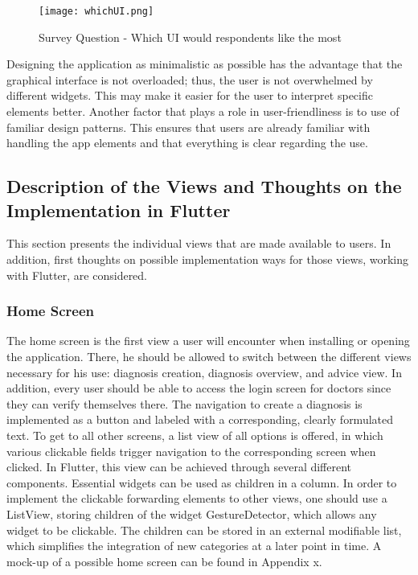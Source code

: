 \begin{figure}[H]
	\centering
	\texttt{[image: whichUI.png]}
	\caption[Survey Question]{Survey Question - Which UI would respondents like the most}
\end{figure}
\noindent
Designing the application as minimalistic as possible has the advantage that the graphical interface is not overloaded; thus, the user is not overwhelmed by different widgets. This may make it easier for the user to interpret specific elements better. Another factor that plays a role in user-friendliness is to use of familiar design patterns. This ensures that users are already familiar with handling the app elements and that everything is clear regarding the use. 

\subsection{Description of the Views and Thoughts on the Implementation in Flutter}
This section presents the individual views that are made available to users. In addition, first thoughts on possible implementation ways for those views, working with Flutter, are considered.
\subsubsection{\textbf{Home Screen}}
The home screen is the first view a user will encounter when installing or opening the application. There, he should be allowed to switch between the different views necessary for his use: diagnosis creation, diagnosis overview, and advice view. In addition, every user should be able to access the login screen for doctors since they can verify themselves there. The navigation to create a diagnosis is implemented as a button and labeled with a corresponding, clearly formulated text. To get to all other screens, a list view of all options is offered, in which various clickable fields trigger navigation to the corresponding screen when clicked. In Flutter, this view can be achieved through several different components. Essential widgets can be used as children in a column. In order to implement the clickable forwarding elements to other views, one should use a ListView, storing children of the widget GestureDetector, which allows any widget to be clickable. The children can be stored in an external modifiable list, which simplifies the integration of new categories at a later point in time. A mock-up of a possible home screen can be found in Appendix x.

